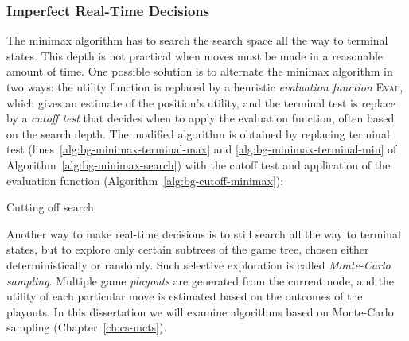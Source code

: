 \subsubsection{Imperfect Real-Time Decisions}

The minimax algorithm has to search the search space all the way
to terminal states. This depth is not practical when moves must be
made in a reasonable amount of time. One possible solution is to
alternate the minimax algorithm in two ways: the utility function is
replaced by a heuristic {\em evaluation function} \textsc{Eval}, which gives an
estimate of the position's utility, and the terminal test is replace
by a {\em cutoff test} that decides when to apply the evaluation
function, often based on the search depth.  The modified algorithm is
obtained by replacing terminal test (lines~\ref{alg:bg-minimax-terminal-max} 
and \ref{alg:bg-minimax-terminal-min} of Algorithm~\ref{alg:bg-minimax-search})
with the cutoff test and application of the evaluation function
(Algorithm~\ref{alg:bg-cutoff-minimax}): 
\begin{algorithm}
\caption{Cutting off search}
\label{alg:bg-cutoff-minimax}
\begin{algorithmic}[1]
     \State \Return {}
  \EndIf
\end{algorithmic}
\end{algorithm}

Another way to make real-time decisions is to still search all the
way to terminal states, but to explore only certain
subtrees of the game tree, chosen either deterministically or
randomly. Such selective exploration is called {\em Monte-Carlo
  sampling}. Multiple game {\em playouts} are generated from the
current node, and the utility of each particular move is estimated
based on the outcomes of the playouts. In this dissertation we will
examine algorithms based on Monte-Carlo sampling (Chapter~\ref{ch:cs-mcts}).
